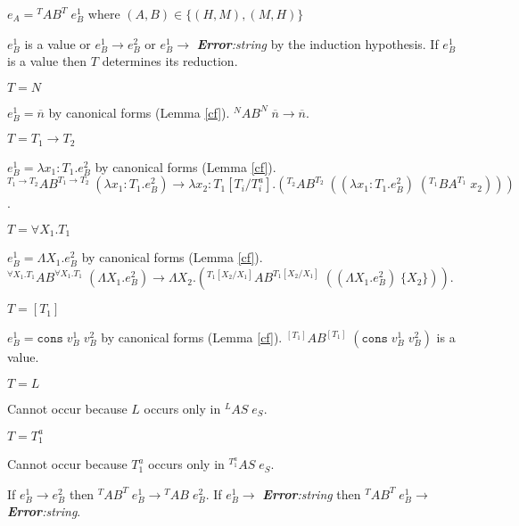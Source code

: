 \begin{case}
$e_{A}={^{T}A}B^{T}\;e_{B}^{1}$ where $(A,B)\in\lbrace(H,M),(M,H)\rbrace$

$e_{B}^{1}$ is a value or $e_{B}^{1}\rightarrow e_{B}^{2}$ or $e_{B}^{1}\rightarrow$ \emph{\textbf{Error}:\;string} by the induction hypothesis.  If $e_{B}^{1}$ is a value then $T$ determines its reduction.
\begin{subcase}
$T=N$

$e_{B}^{1}=\overline{n}$ by canonical forms (Lemma \ref{cf}).  $^{N}AB^{N}\;\overline{n}\rightarrow\overline{n}$.
\end{subcase}
\begin{subcase}
$T=T_{1}\rightarrow T_{2}$

$e_{B}^{1}=\lambda x_{1}:T_{1}.e_{B}^{2}$ by canonical forms (Lemma \ref{cf}).  $^{T_{1}\rightarrow T_{2}}AB^{T_{1}\rightarrow T_{2}}\;(\lambda x_{1}:T_{1}.e_{B}^{2})\rightarrow\lambda x_{2}:T_{1}[T_{i}/T^{a}_{i}].(^{T_{2}}AB^{T_{2}}\;((\lambda x_{1}:T_{1}.e_{B}^{2})\;(^{T_{1}}BA^{T_{1}}\;x_{2})))$.
\end{subcase}
\begin{subcase}
$T=\forall X_{1}.T_{1}$

$e_{B}^{1}=\Lambda X_{1}.e_{B}^{2}$ by canonical forms (Lemma \ref{cf}).  $^{\forall X_{1}.T_{1}}AB^{\forall X_{1}.T_{1}}\;(\Lambda X_{1}.e_{B}^{2})\rightarrow\Lambda X_{2}.(^{T_{1}[X_{2}/X_{1}]}AB^{T_{1}[X_{2}/X_{1}]}\;((\Lambda X_{1}.e_{B}^{2})\;\lbrace X_{2}\rbrace))$.
\end{subcase}
\begin{subcase}
$T=[T_{1}]$

$e_{B}^{1}=\mathtt{cons}\;v_{B}^{1}\;v_{B}^{2}$ by canonical forms (Lemma \ref{cf}).  $^{[T_{1}]}AB^{[T_{1}]}\;(\mathtt{cons}\;v_{B}^{1}\;v_{B}^{2})$ is a value.
\end{subcase}
\begin{subcase}
$T=L$

Cannot occur because $L$ occurs only in $^{L}AS\;e_{S}$.
\end{subcase}
\begin{subcase}
$T=T_{1}^{a}$

Cannot occur because $T_{1}^{a}$ occurs only in $^{T_{1}^{a}}AS\;e_{S}$.
\end{subcase}
If $e_{B}^{1}\rightarrow e_{B}^{2}$ then $^{T}AB^{T}\;e_{B}^{1}\rightarrow{^{T}A}B\;e_{B}^{2}$.  If $e_{B}^{1}\rightarrow$ \emph{\textbf{Error}:\;string} then $^{T}AB^{T}\;e_{B}^{1}\rightarrow$ \emph{\textbf{Error}:\;string}.
\end{case}